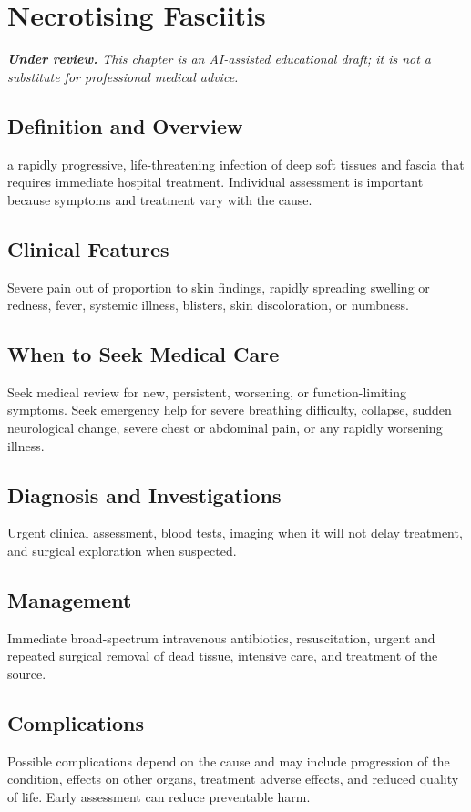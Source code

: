 \chapter{Necrotising Fasciitis}

\medskip
\noindent\textit{\textbf{Under review.} This chapter is an AI-assisted educational draft; it is not a substitute for professional medical advice.}

\section*{Definition and Overview}
a rapidly progressive, life-threatening infection of deep soft tissues and fascia that requires immediate hospital treatment. Individual assessment is important because symptoms and treatment vary with the cause.

\section*{Clinical Features}
Severe pain out of proportion to skin findings, rapidly spreading swelling or redness, fever, systemic illness, blisters, skin discoloration, or numbness.

\section*{When to Seek Medical Care}
Seek medical review for new, persistent, worsening, or function-limiting symptoms. Seek emergency help for severe breathing difficulty, collapse, sudden neurological change, severe chest or abdominal pain, or any rapidly worsening illness.

\section*{Diagnosis and Investigations}
Urgent clinical assessment, blood tests, imaging when it will not delay treatment, and surgical exploration when suspected.

\section*{Management}
Immediate broad-spectrum intravenous antibiotics, resuscitation, urgent and repeated surgical removal of dead tissue, intensive care, and treatment of the source.

\section*{Complications}
Possible complications depend on the cause and may include progression of the condition, effects on other organs, treatment adverse effects, and reduced quality of life. Early assessment can reduce preventable harm.

